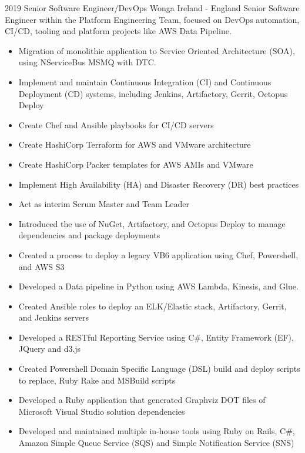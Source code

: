 \begin{twenty}
  {2019}
  {Senior Software Engineer/DevOps}
  {Wonga}
  {Ireland - England}
  {Senior Software Engineer within the Platform Engineering Team, focused on DevOps automation, CI/CD, tooling and platform projects like AWS Data Pipeline.}
  {\begin{itemize}
    \item Migration of monolithic application to Service Oriented Architecture (SOA), using NServiceBus MSMQ with DTC.
    \item Implement and maintain Continuous Integration (CI) and Continuous Deployment (CD) systems, including Jenkins, Artifactory, Gerrit, Octopus Deploy
    \item Create Chef and Ansible playbooks for CI/CD servers
    \item Create HashiCorp Terraform for AWS and VMware architecture
    \item Create HashiCorp Packer templates for AWS AMIs and VMware
    \item Implement High Availability (HA) and Disaster Recovery (DR) best practices
    \item Act as interim Scrum Master and Team Leader
  \end{itemize}
  }
  {\begin{itemize}
    \item Introduced the use of NuGet, Artifactory, and Octopus Deploy to manage dependencies and package deployments
    \item Created a process to deploy a legacy VB6 application using Chef, Powershell, and AWS S3
    \item Developed a Data pipeline in Python using AWS Lambda, Kinesis, and Glue.
    \item Created Ansible roles to deploy an ELK/Elastic stack, Artifactory, Gerrit, and Jenkins servers
    \item Developed a RESTful Reporting Service using C\#, Entity Framework (EF), JQuery and d3.js
    \item Created Powershell Domain Specific Language (DSL) build and deploy scripts to replace, Ruby Rake and MSBuild scripts
    \item Developed a Ruby application that generated Graphviz DOT files of Microsoft Visual Studio solution dependencies
    \item Developed and maintained multiple in-house tools using Ruby on Rails, C\#, Amazon Simple Queue Service (SQS) and Simple Notification Service (SNS)
  \end{itemize}
  }
\end{twenty}
